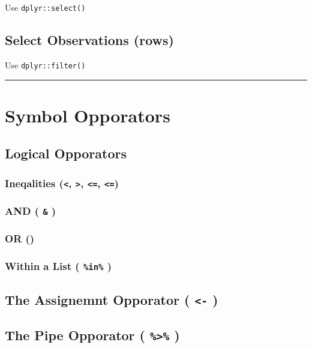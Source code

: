 \documentclass[]{book}
\begin{document}
Use \texttt{dplyr::select()}

\subsection{Select Observations (rows)}\label{select-observations-rows}

Use \texttt{dplyr::filter()}

\begin{center}\rule{0.5\linewidth}{\linethickness}\end{center}

\section{Symbol Opporators}\label{symbol-opporators}

\subsection{Logical Opporators}\label{logical-opporators}

\subsubsection{\texorpdfstring{Ineqalities (\texttt{\textless{}},
\texttt{\textgreater{}}, \texttt{\textless{}=},
\texttt{\textless{}=})}{Ineqalities (\textless{}, \textgreater{}, \textless{}=, \textless{}=)}}\label{ineqalities}

\subsubsection{\texorpdfstring{AND ( \texttt{\&}
)}{AND ( \& )}}\label{and}

\subsubsection{\texorpdfstring{OR
(\texttt{\textbar{}})}{OR (\textbar{})}}\label{or}

\subsubsection{\texorpdfstring{Within a List ( \texttt{\%in\%}
)}{Within a List ( \%in\% )}}\label{within-a-list-in}

\subsection{\texorpdfstring{The Assignemnt Opporator (
\texttt{\textless{}-}
)}{The Assignemnt Opporator ( \textless{}- )}}\label{the-assignemnt-opporator--}

\subsection{\texorpdfstring{The Pipe Opporator (
\texttt{\%\textgreater{}\%}
)}{The Pipe Opporator ( \%\textgreater{}\% )}}\label{the-pipe-opporator}


\end{document}
